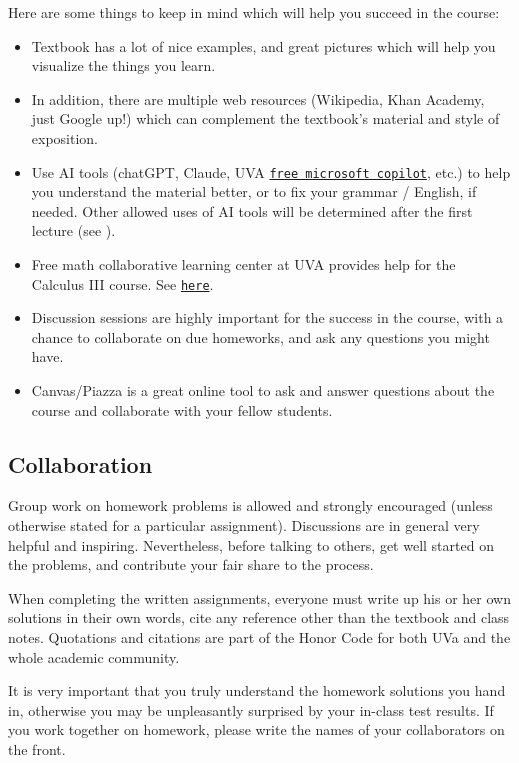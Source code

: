 \documentclass[oneside,11pt]{amsart}
\theoremstyle{definition}
\begin{document}
Here are some things to keep in mind which will help you succeed in the course:
\begin{itemize}
	\item Textbook has a lot of nice examples, and great pictures which will help you visualize the things you learn.
	\item In addition, there are multiple web resources (Wikipedia, Khan Academy, just Google up!) which can complement the textbook's material and style of exposition.
	\item Use AI tools (chatGPT, Claude, UVA \href{https://virginia.service-now.com/its?id=itsweb_kb_article&sys_id=dbe41947dbe3f91066d98f38139619db}{\textcolor{green!70!black}{\texttt{free microsoft copilot}}}, etc.) to help you understand the material better, or to fix your grammar / English, if needed. Other allowed uses of AI tools will be determined after the first lecture (see ).
	\item Free math collaborative learning center at UVA provides help for the Calculus III course. See \href{https://math.virginia.edu/undergraduate/MCLC/}{\textcolor{green!70!black}{\texttt{here}}}.
	\item 
	Discussion sessions are highly important for the success in the course, with a chance to collaborate on due homeworks, and ask any questions you might have.
	\item Canvas/Piazza is a great online tool to ask and answer questions about the course and collaborate with your fellow students.
\end{itemize}

\subsection{Collaboration}

Group work on homework problems is allowed and strongly encouraged (unless otherwise stated for a particular assignment). Discussions are in general very helpful and inspiring. Nevertheless, before talking to others, get well started on the problems, and contribute your fair share to the process. 

When completing the written assignments, everyone must write up his or her own solutions in their own words, cite any reference other than the textbook and class notes. Quotations and citations are part of the Honor Code for both UVa and the whole academic community. 

It is very important that you truly understand the homework solutions you hand in, otherwise you may be unpleasantly surprised by your in-class test results.
If you work together on homework, please write the names of your collaborators on the front.
\label{academic_integrity}
\end{document}
